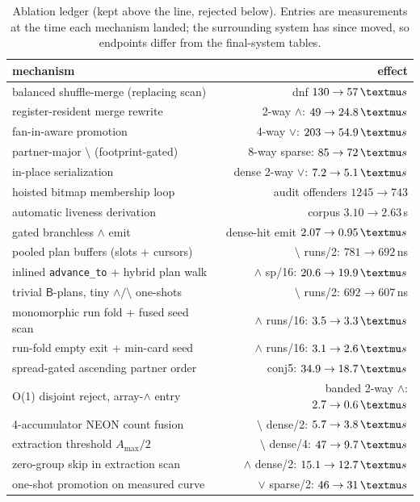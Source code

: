 \documentclass[sigconf,nonacm]{acmart}
\newcommand{\us}{\,\textmu s}
\newcommand{\B}{\ensuremath{\mathsf{B}}}
\begin{document}
\begin{table}[t]
\caption{Ablation ledger (kept above the line, rejected below).
Entries are measurements at the time each mechanism landed; the
surrounding system has since moved, so endpoints differ from the
final-system tables.}
\label{tab:abl}
\small
\begin{tabular}{p{5.4cm}r}
\toprule
mechanism & effect \\
\midrule
balanced shuffle-merge (replacing scan) & dnf $130 \to 57\us$ \\
register-resident merge rewrite & 2-way $\wedge$: $49 \to 24.8\us$ \\
fan-in-aware promotion & 4-way $\vee$: $203 \to 54.9\us$ \\
partner-major $\setminus$ (footprint-gated) & 8-way sparse: $85 \to 72\us$ \\
in-place serialization & dense 2-way $\vee$: $7.2 \to 5.1\us$ \\
hoisted bitmap membership loop & audit offenders $1245 \to 743$ \\
automatic liveness derivation & corpus $3.10 \to 2.63$\,s \\
gated branchless $\wedge$ emit & dense-hit emit $2.07 \to 0.95\us$ \\
pooled plan buffers (slots + cursors) & $\setminus$ runs/2: $781 \to 692$\,ns \\
inlined \texttt{advance\_to} + hybrid plan walk & $\wedge$ sp/16: $20.6 \to 19.9\us$ \\
trivial $\B$-plans, tiny $\wedge/\setminus$ one-shots & $\setminus$ runs/2: $692 \to 607$\,ns \\
monomorphic run fold + fused seed scan & $\wedge$ runs/16: $3.5 \to 3.3\us$ \\
run-fold empty exit + min-card seed & $\wedge$ runs/16: $3.1 \to 2.6\us$ \\
spread-gated ascending partner order & conj5: $34.9 \to 18.7\us$ \\
O(1) disjoint reject, array-$\wedge$ entry & banded 2-way $\wedge$: $2.7 \to 0.6\us$ \\
4-accumulator NEON count fusion & $\setminus$ dense/2: $5.7 \to 3.8\us$ \\
extraction threshold $A_{\max}/2$ & $\setminus$ dense/4: $47 \to 9.7\us$ \\
zero-group skip in extraction scan & $\wedge$ dense/2: $15.1 \to 12.7\us$ \\
one-shot promotion on measured curve & $\vee$ sparse/2: $46 \to 31\us$ \\

\end{tabular}
\end{table}
\end{document}
